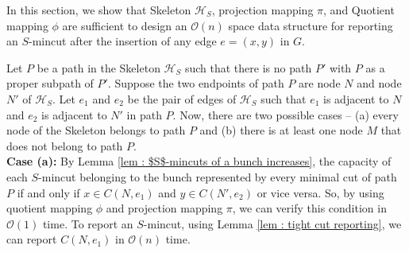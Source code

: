 \documentclass[letterpaper,11pt]{article}
\begin{document}
In this section, we show that Skeleton ${\mathcal H}_S$, projection mapping $\pi$, and Quotient mapping $\phi$ are sufficient to design an ${\mathcal O}(n)$ space data structure for reporting an $S$-mincut after the insertion of any edge $e=(x,y)$ in $G$. 

Let $P$ be a path in the Skeleton ${\mathcal H}_S$ such that there is no path $P'$ with $P$ as a proper subpath of $P'$. Suppose the two endpoints of path $P$ are node $N$ and node $N'$ of ${\mathcal H}_S$. Let $e_1$ and $e_2$ be the pair of edges of ${\mathcal H}_S$ such that $e_1$ is adjacent to $N$ and $e_2$ is adjacent to $N'$ in path $P$. Now, there are two possible cases -- (a) every node of the Skeleton belongs to path $P$ and (b) there is at least one node $M$ that does not belong to path $P$. \\

\noindent
\textbf{Case (a):} By Lemma \ref{lem : $S$-mincuts of a bunch increases}, the capacity of each $S$-mincut belonging to the bunch represented by every minimal cut of path $P$ if and only if $x\in C(N,e_1)$ and $y\in C(N',e_2)$ or vice versa. So, by using quotient mapping $\phi$ and projection mapping $\pi$, we can verify this condition in ${\mathcal O}(1)$ time. To report an $S$-mincut, using Lemma \ref{lem : tight cut reporting}, we can report $C(N,e_1)$ in ${\mathcal O}(n)$ time.  \\
\end{document}
